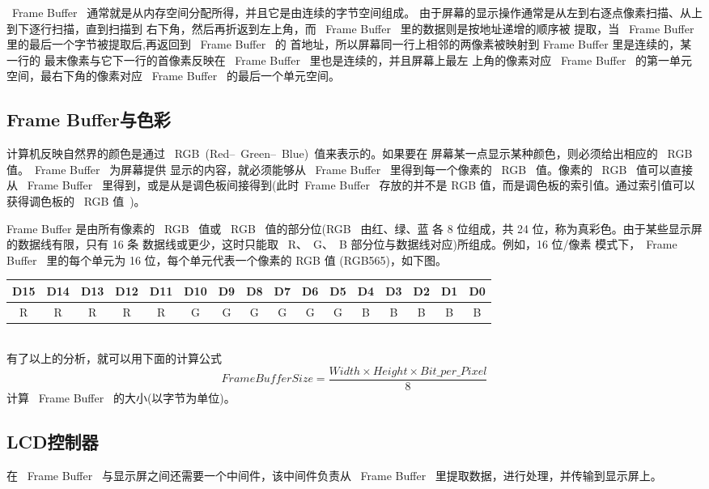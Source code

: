 	~Frame Buffer~ 通常就是从内存空间分配所得，并且它是由连续的字节空间组成。
由于屏幕的显示操作通常是从左到右逐点像素扫描、从上到下逐行扫描，直到扫描到
右下角，然后再折返到左上角，而 ~Frame Buffer~ 里的数据则是按地址递增的顺序被
提取，当 ~Frame Buffer~ 里的最后一个字节被提取后,再返回到 ~Frame Buffer~ 的
首地址，所以屏幕同一行上相邻的两像素被映射到 Frame Buffer 里是连续的，某一行的
最末像素与它下一行的首像素反映在 ~Frame Buffer~ 里也是连续的，并且屏幕上最左
上角的像素对应 ~Frame Buffer~ 的第一单元空间，最右下角的像素对应 ~Frame
Buffer~ 的最后一个单元空间。

\subsection{Frame Buffer与色彩}
	计算机反映自然界的颜色是通过 ~RGB~(Red--~Green--~Blue)~值来表示的。如果要在
屏幕某一点显示某种颜色，则必须给出相应的 ~RGB~ 值。~Frame Buffer~ 为屏幕提供
显示的内容，就必须能够从 ~Frame Buffer~ 里得到每一个像素的 ~RGB~ 值。像素的
~RGB~ 值可以直接从 ~Frame Buffer~ 里得到，或是从是调色板间接得到(此时~Frame
Buffer~ 存放的并不是 RGB 值，而是调色板的索引值。通过索引值可以获得调色板的
~RGB 值~)。

	Frame Buffer 是由所有像素的 ~RGB~ 值或 ~RGB~ 值的部分位(RGB~ 由红、绿、蓝
各 8 位组成，共 24 位，称为真彩色。由于某些显示屏的数据线有限，只有 16 条
数据线或更少，这时只能取 ~R、~G、~B 部分位与数据线对应)所组成。例如，16 位/像素
模式下，~Frame Buffer~ 里的每个单元为 16 位，每个单元代表一个像素的 RGB 值
(RGB565)，如下图。\ \\
{\small
\begin{tabular}{|*{16}{c|}}
\hline
   D15 & D14 & D13 & D12 & D11 & D10 & D9 & D8 &
        D7 & D6 & D5 & D4 & D3 & D2 & D1 & D0\\\hline
  R & R & R & R & R & G & G & G & G & G & G & B & B & B & B & B\\\hline
\end{tabular}
}
\ \\

	有了以上的分析，就可以用下面的计算公式
$$
	FrameBufferSize=\frac{Width \times Height \times Bit\_per\_Pixel}{8}
$$
计算 ~Frame Buffer~ 的大小(以字节为单位)。

\subsection{LCD控制器}
	在 ~Frame Buffer~ 与显示屏之间还需要一个中间件，该中间件负责从 ~Frame
Buffer~ 里提取数据，进行处理，并传输到显示屏上。

